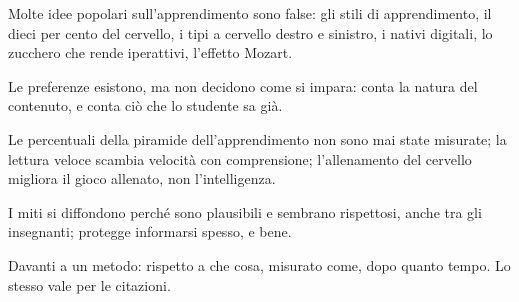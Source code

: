 \begin{sintesi}
  \item Molte idee popolari sull'apprendimento sono false: gli stili di
        apprendimento, il dieci per cento del cervello, i tipi a
        cervello destro e sinistro, i nativi digitali, lo zucchero che
        rende iperattivi, l'effetto Mozart.
  \item Le preferenze esistono, ma non decidono come si impara: conta
        la natura del contenuto, e conta ciò che lo studente sa già.
  \item Le percentuali della piramide dell'apprendimento non sono mai
        state misurate; la lettura veloce scambia velocità con
        comprensione; l'allenamento del cervello migliora il gioco
        allenato, non l'intelligenza.
  \item I miti si diffondono perché sono plausibili e sembrano
        rispettosi, anche tra gli insegnanti; protegge informarsi
        spesso, e bene.
  \item Davanti a un metodo: rispetto a che cosa, misurato come, dopo
        quanto tempo. Lo stesso vale per le citazioni.
\end{sintesi}

\finecapitolo
